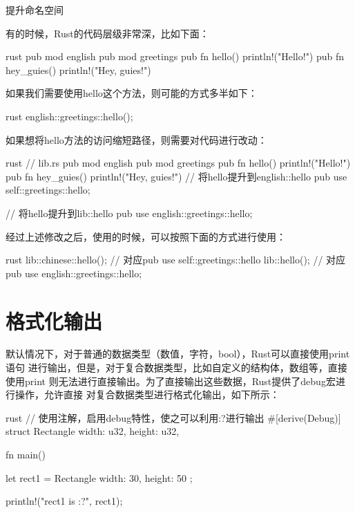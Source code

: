\begin{outline}[enumerate]
\1 提升命名空间

有的时候，Rust的代码层级非常深，比如下面：
\begin{code-in-enumerate}{rust}
pub mod english {
    pub mod greetings {
        pub fn hello() {
            println!("Hello!")
        }
        pub fn hey_guies() {
            println!("Hey, guies!")
        }
    }
}
\end{code-in-enumerate}
如果我们需要使用hello这个方法，则可能的方式多半如下：
\begin{code-in-enumerate}{rust}
english::greetings::hello();
\end{code-in-enumerate}
如果想将hello方法的访问缩短路径，则需要对代码进行改动：
\begin{code-in-enumerate}{rust}
// lib.rs
pub mod english {
    pub mod greetings {
        pub fn hello() {
            println!("Hello!")
        }
        pub fn hey_guies() {
            println!("Hey, guies!")
        }
    }
    // 将hello提升到english::hello
    pub use self::greetings::hello;
}

// 将hello提升到lib::hello
pub use english::greetings::hello;
\end{code-in-enumerate}
经过上述修改之后，使用的时候，可以按照下面的方式进行使用：
\begin{code-in-enumerate}{rust}
lib::chinese::hello(); // 对应pub use self::greetings::hello
lib::hello(); // 对应 pub use english::greetings::hello;
\end{code-in-enumerate}

\end{outline}

\section{格式化输出}
默认情况下，对于普通的数据类型（数值，字符，bool），Rust可以直接使用print语句
进行输出，但是，对于复合数据类型，比如自定义的结构体，数组等，直接使用print
则无法进行直接输出。为了直接输出这些数据，Rust提供了debug宏进行操作，允许直接
对复合数据类型进行格式化输出，如下所示：
\begin{code-block}{rust}
// 使用注解，启用debug特性，使之可以利用:?进行输出
#[derive(Debug)]
struct Rectangle {
    width: u32,
    height: u32,
}

fn main() {
    let rect1 = Rectangle { width: 30, height: 50 };

    println!("rect1 is {:?}", rect1);
}
\end{code-block}

